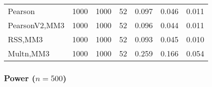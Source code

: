 \documentclass[
]{article}
\begin{document}
\begin{table}[H]
{\begin{tabular}[t]{lrrrrrr}
\hspace{1em}Pearson & 1000 & 1000 & 52 & 0.097 & 0.046 & 0.011\\
\hspace{1em}PearsonV2,MM3 & 1000 & 1000 & 52 & 0.096 & 0.044 & 0.011\\
\hspace{1em}RSS,MM3 & 1000 & 1000 & 52 & 0.093 & 0.045 & 0.010\\
\hspace{1em}Multn,MM3 & 1000 & 1000 & 52 & 0.259 & 0.166 & 0.054\\
\bottomrule
\end{tabular}}
\end{table}

\hypertarget{power-n500-1}{%
\subsubsection{\texorpdfstring{Power
(\(n=500\))}{Power (n=500)}}\label{power-n500-1}}
\end{document}
